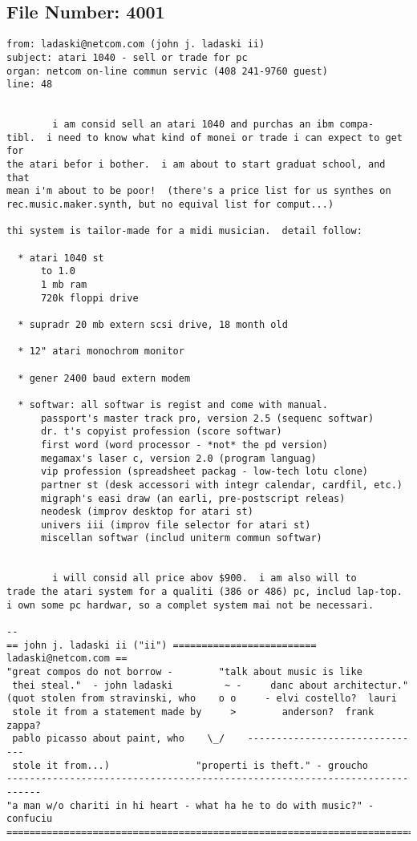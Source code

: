 \subsection{File Number: 4001}
\begin{verbatim}
from: ladaski@netcom.com (john j. ladaski ii)
subject: atari 1040 - sell or trade for pc
organ: netcom on-line commun servic (408 241-9760 guest)
line: 48


        i am consid sell an atari 1040 and purchas an ibm compa-
tibl.  i need to know what kind of monei or trade i can expect to get for
the atari befor i bother.  i am about to start graduat school, and that
mean i'm about to be poor!  (there's a price list for us synthes on
rec.music.maker.synth, but no equival list for comput...)

thi system is tailor-made for a midi musician.  detail follow:

  * atari 1040 st
      to 1.0
      1 mb ram
      720k floppi drive

  * supradr 20 mb extern scsi drive, 18 month old

  * 12" atari monochrom monitor

  * gener 2400 baud extern modem

  * softwar: all softwar is regist and come with manual.
      passport's master track pro, version 2.5 (sequenc softwar)
      dr. t's copyist profession (score softwar)
      first word (word processor - *not* the pd version)
      megamax's laser c, version 2.0 (program languag)
      vip profession (spreadsheet packag - low-tech lotu clone)
      partner st (desk accessori with integr calendar, cardfil, etc.)
      migraph's easi draw (an earli, pre-postscript releas)
      neodesk (improv desktop for atari st)
      univers iii (improv file selector for atari st)
      miscellan softwar (includ uniterm commun softwar)


        i will consid all price abov $900.  i am also will to
trade the atari system for a qualiti (386 or 486) pc, includ lap-top.
i own some pc hardwar, so a complet system mai not be necessari.

-- 
== john j. ladaski ii ("ii") ========================= ladaski@netcom.com ==
"great compos do not borrow -	     "talk about music is like
 thei steal."  - john ladaski	      ~ -     danc about architectur."
(quot stolen from stravinski, who    o o     - elvi costello?  lauri
 stole it from a statement made by     >        anderson?  frank zappa?
 pablo picasso about paint, who    \_/    -------------------------------
 stole it from...)			     "properti is theft." - groucho
----------------------------------------------------------------------------
"a man w/o chariti in hi heart - what ha he to do with music?" - confuciu
============================================================================
\end{verbatim}
